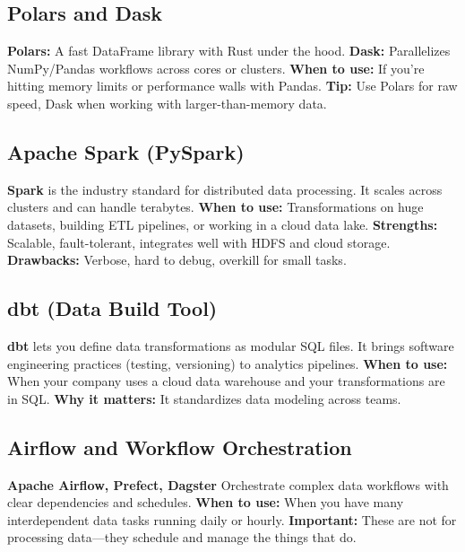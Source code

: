 \documentclass[12pt,openany, draft]{book}
\begin{document}
\subsection*{Polars and Dask}

\textbf{Polars:} A fast DataFrame library with Rust under the hood. \newline
\textbf{Dask:} Parallelizes NumPy/Pandas workflows across cores or clusters. \newline
\textbf{When to use:} If you're hitting memory limits or performance walls with Pandas. \newline
\textbf{Tip:} Use Polars for raw speed, Dask when working with larger-than-memory data.

\subsection*{Apache Spark (PySpark)}

\textbf{Spark} is the industry standard for distributed data processing. It scales across clusters and can handle terabytes. \newline
\textbf{When to use:} Transformations on huge datasets, building ETL pipelines, or working in a cloud data lake. \newline
\textbf{Strengths:} Scalable, fault-tolerant, integrates well with HDFS and cloud storage. \newline
\textbf{Drawbacks:} Verbose, hard to debug, overkill for small tasks.

\subsection*{dbt (Data Build Tool)}

\textbf{dbt} lets you define data transformations as modular SQL files. It brings software engineering practices (testing, versioning) to analytics pipelines. \newline
\textbf{When to use:} When your company uses a cloud data warehouse and your transformations are in SQL. \newline
\textbf{Why it matters:} It standardizes data modeling across teams.

\subsection*{Airflow and Workflow Orchestration}

\textbf{Apache Airflow, Prefect, Dagster} \newline
Orchestrate complex data workflows with clear dependencies and schedules. \newline
\textbf{When to use:} When you have many interdependent data tasks running daily or hourly. \newline
\textbf{Important:} These are not for processing data—they schedule and manage the things that do.
\end{document}

